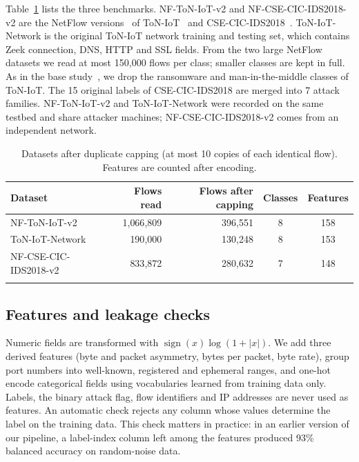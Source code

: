 \documentclass[pdflatex,sn-mathphys-num]{sn-jnl}
\begin{document}
Table~\ref{tab:datasets} lists the three benchmarks. NF-ToN-IoT-v2 and NF-CSE-CIC-IDS2018-v2 are the NetFlow versions~\cite{sarhan2022standard} of ToN-IoT~\cite{moustafa2021toniot} and CSE-CIC-IDS2018~\cite{sharafaldin2018cicids}. ToN-IoT-Network is the original ToN-IoT network training and testing set, which contains Zeek connection, DNS, HTTP and SSL fields. From the two large NetFlow datasets we read at most 150{,}000 flows per class; smaller classes are kept in full. As in the base study~\cite{altfaily2025fedgatsage}, we drop the ransomware and man-in-the-middle classes of ToN-IoT. The 15 original labels of CSE-CIC-IDS2018 are merged into 7 attack families. NF-ToN-IoT-v2 and ToN-IoT-Network were recorded on the same testbed and share attacker machines; NF-CSE-CIC-IDS2018-v2 comes from an independent network.

\begin{table}[t]
\caption{Datasets after duplicate capping (at most 10 copies of each identical flow). Features are counted after encoding.}\label{tab:datasets}
\begin{tabular*}{\textwidth}{@{\extracolsep\fill}lrrcc}
\toprule
Dataset & Flows read & Flows after capping & Classes & Features \\
\midrule
NF-ToN-IoT-v2 & 1{,}066{,}809 & 396{,}551 & 8 & 158 \\
ToN-IoT-Network & 190{,}000 & 130{,}248 & 8 & 153 \\
NF-CSE-CIC-IDS2018-v2 & 833{,}872 & 280{,}632 & 7 & 148 \\
\botrule
\end{tabular*}
\end{table}

\subsection{Features and leakage checks}\label{sec:features}

Numeric fields are transformed with $\operatorname{sign}(x)\log(1+|x|)$. We add three derived features (byte and packet asymmetry, bytes per packet, byte rate), group port numbers into well-known, registered and ephemeral ranges, and one-hot encode categorical fields using vocabularies learned from training data only. Labels, the binary attack flag, flow identifiers and IP addresses are never used as features. An automatic check rejects any column whose values determine the label on the training data. This check matters in practice: in an earlier version of our pipeline, a label-index column left among the features produced 93\% balanced accuracy on random-noise data.
\end{document}
